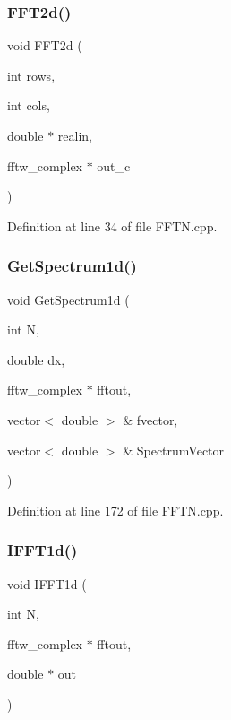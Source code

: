 \subsubsection{F\+F\+T2d()\hspace{0.1cm}{\footnotesize\ttfamily [2/2]}}
{\footnotesize\ttfamily void F\+F\+T2d (\begin{DoxyParamCaption}\item[{int}]{rows,  }\item[{int}]{cols,  }\item[{double $\ast$}]{realin,  }\item[{fftw\+\_\+complex $\ast$}]{out\+\_\+c }\end{DoxyParamCaption})}



Definition at line 34 of file F\+F\+T\+N.\+cpp.

\mbox{\label{FFTN_8h_ad995b45ac5f0cf6940a4be9e90d3a380_ad995b45ac5f0cf6940a4be9e90d3a380}} 
\subsubsection{Get\+Spectrum1d()}
{\footnotesize\ttfamily void Get\+Spectrum1d (\begin{DoxyParamCaption}\item[{int}]{N,  }\item[{double}]{dx,  }\item[{fftw\+\_\+complex $\ast$}]{fftout,  }\item[{vector$<$ double $>$ \&}]{fvector,  }\item[{vector$<$ double $>$ \&}]{Spectrum\+Vector }\end{DoxyParamCaption})}



Definition at line 172 of file F\+F\+T\+N.\+cpp.

\mbox{\label{FFTN_8h_ae5e210dd6f00da89c5579b986b9f7580_ae5e210dd6f00da89c5579b986b9f7580}} 
\subsubsection{I\+F\+F\+T1d()\hspace{0.1cm}{\footnotesize\ttfamily [1/2]}}
{\footnotesize\ttfamily void I\+F\+F\+T1d (\begin{DoxyParamCaption}\item[{int}]{N,  }\item[{fftw\+\_\+complex $\ast$}]{fftout,  }\item[{double $\ast$}]{out }\end{DoxyParamCaption})}



